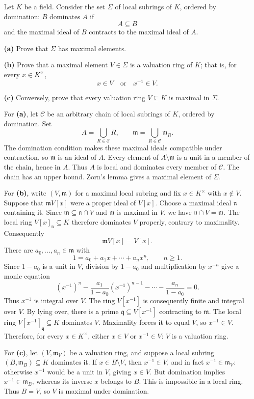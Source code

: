 \begin{problem}[CP-V-0035]
\label{prob:cp-v-0035}
Let \(K\) be a field. Consider the set \(\Sigma\) of local subrings of \(K\),
ordered by domination: \(B\) dominates \(A\) if
\[
A\subseteq B
\]
and the maximal ideal of \(B\) contracts to the maximal ideal of \(A\).

\textbf{(a)} Prove that \(\Sigma\) has maximal elements.

\textbf{(b)} Prove that a maximal element \(V\in\Sigma\) is a valuation ring
of \(K\); that is, for every \(x\in K^\times\),
\[
x\in V
\quad\text{or}\quad
x^{-1}\in V.
\]

\textbf{(c)} Conversely, prove that every valuation ring \(V\subseteq K\) is
maximal in \(\Sigma\).
\end{problem}

\begin{solution}
For \textbf{(a)}, let \(\mathcal C\) be an arbitrary chain of local
subrings of \(K\), ordered by domination. Set
\[
A=\bigcup_{R\in\mathcal C}R,
\qquad
\mathfrak m=\bigcup_{R\in\mathcal C}\mathfrak m_R.
\]
The domination condition makes these maximal ideals compatible under
contraction, so \(\mathfrak m\) is an ideal of \(A\). Every element of
\(A\setminus\mathfrak m\) is a unit in a member of the chain, hence
in \(A\). Thus \(A\) is local and dominates every member of
\(\mathcal C\). The chain has an upper bound. Zorn's lemma gives a
maximal element of \(\Sigma\).

For \textbf{(b)}, write \((V,\mathfrak m)\) for a maximal local subring
and fix \(x\in K^\times\) with \(x\notin V\). Suppose that
\(\mathfrak mV[x]\) were a proper ideal of \(V[x]\). Choose a
maximal ideal \(\mathfrak n\) containing it. Since
\(\mathfrak m\subseteq\mathfrak n\cap V\) and \(\mathfrak m\) is
maximal in \(V\), we have \(\mathfrak n\cap V=\mathfrak m\).
The local ring \(V[x]_{\mathfrak n}\subseteq K\) therefore dominates
\(V\) properly, contrary to maximality. Consequently
\[
\mathfrak mV[x]=V[x].
\]
There are \(a_0,\ldots,a_n\in\mathfrak m\) with
\[
1=a_0+a_1x+\cdots+a_nx^n,
\qquad n\ge1.
\]
Since \(1-a_0\) is a unit in \(V\), division by \(1-a_0\)
and multiplication by \(x^{-n}\) give a monic equation
\[
(x^{-1})^n-
\frac{a_1}{1-a_0}(x^{-1})^{n-1}-\cdots-
\frac{a_n}{1-a_0}=0.
\]
Thus \(x^{-1}\) is integral over \(V\). The ring \(V[x^{-1}]\)
is consequently finite and integral over \(V\). By lying over, there
is a prime \(\mathfrak q\subseteq V[x^{-1}]\) contracting to
\(\mathfrak m\). The local ring
\(V[x^{-1}]_{\mathfrak q}\subseteq K\) dominates \(V\).
Maximality forces it to equal \(V\), so \(x^{-1}\in V\).
Therefore, for every \(x\in K^\times\), either \(x\in V\) or
\(x^{-1}\in V\): \(V\) is a valuation ring.

For \textbf{(c)}, let \((V,\mathfrak m_V)\) be a valuation ring,
and suppose a local subring \((B,\mathfrak m_B)\subseteq K\)
dominates it. If \(x\in B\setminus V\), then
\(x^{-1}\in V\), and in fact \(x^{-1}\in\mathfrak m_V\):
otherwise \(x^{-1}\) would be a unit in \(V\), giving \(x\in V\).
But domination implies
\(x^{-1}\in\mathfrak m_B\), whereas its inverse \(x\) belongs
to \(B\). This is impossible in a local ring. Thus \(B=V\),
so \(V\) is maximal under domination.
\end{solution}


